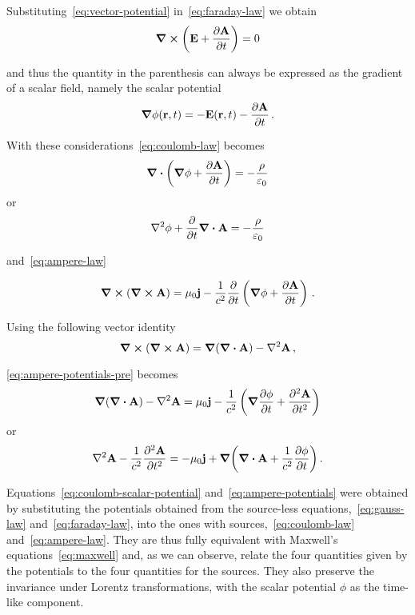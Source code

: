 \documentclass[12pt, class=report, crop=false]{standalone}
\begin{document}
Substituting~\eqref{eq:vector-potential} in~\eqref{eq:faraday-law} we obtain
\begin{equation}
  \label{eq:faraday-vector-potential}
  \curl(\vb{E} + \pdv{\vb{A}}{t}) = 0
\end{equation}

and thus the quantity in the parenthesis can always be expressed as the
gradient of a scalar field, namely the scalar potential
\[
\grad{\phi}(\vb{r}, t) = -\vb{E}(\vb{r}, t) - \pdv{\vb{A}}{t}\,.
\]

With these considerations~\eqref{eq:coulomb-law} becomes
\[
  \div(\grad{\phi} + \pdv{\vb{A}}{t}) = - \frac{\rho}{\varepsilon_0}
\]
or
\begin{equation}
  \label{eq:coulomb-scalar-potential}
  \laplacian{\phi} + \pdv{t}\div{\vb{A}} = - \frac{\rho}{\varepsilon_0}
\end{equation}

and~\eqref{eq:ampere-law}

\begin{equation}
  \label{eq:ampere-potentials-pre}
  \curl(\curl{\vb{A}}) = \mu_0 \vb{j}
    - \frac{1}{c^2} \pdv{t} \left( \grad{\phi} + \pdv{\vb{A}}{t} \right)\,.
\end{equation}

Using the following vector identity
\begin{equation}
  \label{eq:curl-of-curl}
  \curl(\curl{\vb{A}}) = \grad(\div{\vb{A}}) - \laplacian{\vb{A}}\,,
\end{equation}

\cref{eq:ampere-potentials-pre} becomes
\[
  \grad(\div{\vb{A}}) - \laplacian{\vb{A}} = \mu_0 \vb{j}
    - \frac{1}{c^2} \left( \grad{\pdv{\phi}{t}} + \pdv[2]{\vb{A}}{t} \right)
\]
or
\begin{equation}
  \label{eq:ampere-potentials}
  \laplacian{\vb{A}} - \frac{1}{c^2}\pdv[2]{\vb{A}}{t} =
    -\mu_0 \vb{j} + \grad(\div{\vb{A}} + \frac{1}{c^2} \pdv{\phi}{t})\,.
\end{equation}

Equations~\eqref{eq:coulomb-scalar-potential} and~\eqref{eq:ampere-potentials}
were obtained by substituting the potentials obtained from the source-less
equations,~\eqref{eq:gauss-law} and~\eqref{eq:faraday-law}, into the ones
with sources,~\eqref{eq:coulomb-law} and~\eqref{eq:ampere-law}. They are thus
fully equivalent with Maxwell's equations~\eqref{eq:maxwell} and, as we can observe,
relate the four quantities given by the potentials to the four quantities for the
sources. They also preserve the invariance under Lorentz transformations, with
the scalar potential \(\phi\) as the time-like component.
\end{document}
